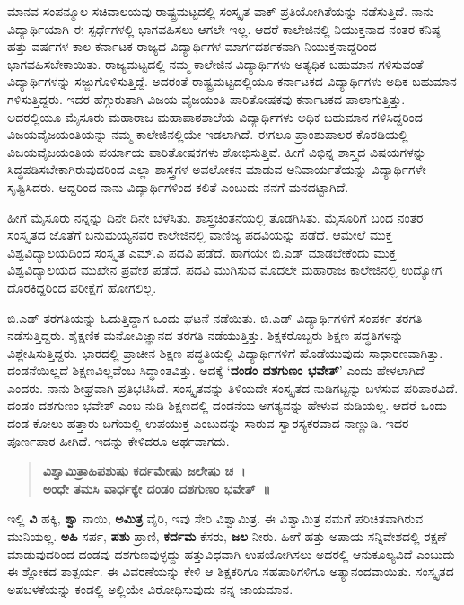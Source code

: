 {ಮಾನವ ಸಂಪನ್ಮೂಲ ಸಚಿವಾಲಯವು ರಾಷ್ಟ್ರಮಟ್ಟದಲ್ಲಿ ಸಂಸ್ಕೃತ ವಾಕ್ ಪ್ರತಿ\-ಯೋಗಿತೆಯನ್ನು ನಡೆಸುತ್ತಿದೆ.  ನಾನು ವಿದ್ಯಾರ್ಥಿಯಾಗಿ ಈ ಸ್ಪರ್ಧೆಗಳಲ್ಲಿ ಭಾಗ\-ವಹಿಸಲು ಆಗಲೇ ಇಲ್ಲ.  ಆದರೆ ಕಾಲೇಜಿನಲ್ಲಿ ನಿಯುಕ್ತನಾದ ನಂತರ ಕನಿಷ್ಠ ಹತ್ತು ವರ್ಷಗಳ ಕಾಲ ಕರ್ನಾಟಕ ರಾಜ್ಯದ ವಿದ್ಯಾರ್ಥಿಗಳ ಮಾರ್ಗದರ್ಶಕನಾಗಿ ನಿಯುಕ್ತನಾದ್ದರಿಂದ ಭಾಗವ\-ಹಿಸಬೇಕಾಯಿತು.  ರಾಜ್ಯಮಟ್ಟದಲ್ಲಿ ನಮ್ಮ ಕಾಲೇಜಿನ ವಿದ್ಯಾರ್ಥಿಗಳು ಅತ್ಯಧಿಕ ಬಹುಮಾನ ಗಳಿಸುವಂತೆ ವಿದ್ಯಾರ್ಥಿಗಳನ್ನು ಸಜ್ಜುಗೊಳಿಸುತ್ತಿದ್ದೆ.  ಅದರಂತೆ ರಾಷ್ಟ್ರಮಟ್ಟದಲ್ಲಿಯೂ ಕರ್ನಾಟಕದ ವಿದ್ಯಾರ್ಥಿಗಳು ಅಧಿಕ ಬಹುಮಾನ ಗಳಿಸುತ್ತಿದ್ದರು.  ಇದರ ಹೆಗ್ಗುರುತಾಗಿ ವಿಜಯ ವೈಜಯಂತಿ ಪಾರಿತೋಷಕವು ಕರ್ನಾಟಕದ ಪಾಲಾಗುತ್ತಿತ್ತು.  ಅದರಲ್ಲಿಯೂ ಮೈಸೂರು ಮಹಾರಾಜ ಮಹಾಪಾಠಶಾಲೆಯ ವಿದ್ಯಾರ್ಥಿ\-ಗಳು ಅಧಿಕ ಬಹುಮಾನ ಗಳಿಸಿದ್ದರಿಂದ ವಿಜಯವೈಜಯಂತಿಯನ್ನು ನಮ್ಮ ಕಾಲೇಜಿನಲ್ಲಿಯೇ ಇಡಲಾಗಿದೆ.  ಈಗಲೂ ಪ್ರಾಂಶುಪಾಲರ ಕೊಠಡಿಯಲ್ಲಿ ವಿಜಯವೈಜಯಂತಿಯ ಪರ್ಯಾಯ ಪಾರಿತೋಷಕಗಳು ಶೋಭಿಸುತ್ತಿವೆ.  ಹೀಗೆ ವಿಭಿನ್ನ ಶಾಸ್ತ್ರದ ವಿಷಯಗಳನ್ನು ಸಿದ್ಧಪಡಿಸಬೇಕಾಗಿರುವುದರಿಂದ ಎಲ್ಲಾ ಶಾಸ್ತ್ರಗಳ ಅವಲೋಕನ ಮಾಡುವ ಅನಿವಾರ್ಯತೆಯನ್ನು ವಿದ್ಯಾರ್ಥಿಗಳೇ ಸೃಷ್ಟಿಸಿದರು.   ಆದ್ದರಿಂದ ನಾನು ವಿದ್ಯಾರ್ಥಿಗಳಿಂದ ಕಲಿತೆ ಎಂಬುದು ನನಗೆ ಮನದಟ್ಟಾಗಿದೆ.  

ಹೀಗೆ ಮೈಸೂರು ನನ್ನನ್ನು ದಿನೇ ದಿನೇ ಬೆಳೆಸಿತು.  ಶಾಸ್ತ್ರಚಿಂತನೆಯಲ್ಲಿ ತೊಡಗಿಸಿತು.  ಮೈಸೂರಿಗೆ ಬಂದ ನಂತರ ಸಂಸ್ಕೃತದ ಜೊತೆಗೆ ಬನುಮಯ್ಯನವರ ಕಾಲೇಜಿನಲ್ಲಿ ವಾಣಿಜ್ಯ ಪದವಿಯನ್ನು ಪಡೆದೆ. ಆಮೇಲೆ ಮುಕ್ತ ವಿಶ್ವವಿದ್ಯಾಲಯದಿಂದ ಸಂಸ್ಕೃತ ಎಮ್.ಎ ಪದವಿ ಪಡೆದೆ. ಹಾಗೆಯೇ ಬಿ.ಎಡ್ ಮಾಡಬೇಕೆಂದು ಮುಕ್ತ ವಿಶ್ವವಿದ್ಯಾ\-ಲಯದ ಮುಖೇನ ಪ್ರವೇಶ ಪಡೆದೆ. ಪದವಿ ಮುಗಿಸುವ ಮೊದಲೇ ಮಹಾರಾಜ ಕಾಲೇಜಿ\-ನಲ್ಲಿ ಉದ್ಯೋಗ ದೊರಕಿದ್ದರಿಂದ ಪರೀಕ್ಷೆಗೆ ಹೋಗಲಿಲ್ಲ.  

ಬಿ.ಎಡ್ ತರಗತಿಯನ್ನು ಓದುತ್ತಿದ್ದಾಗ ಒಂದು ಘಟನೆ ನಡೆಯಿತು.  ಬಿ.ಎಡ್ ವಿದ್ಯಾರ್ಥಿಗಳಿಗೆ ಸಂಪರ್ಕ ತರಗತಿ ನಡೆಸುತ್ತಿದ್ದರು. ಶೈಕ್ಷಣಿಕ ಮನೋವಿಜ್ಞಾನದ ತರಗತಿ ನಡೆಯುತ್ತಿತ್ತು.  ಶಿಕ್ಷಕರೊಬ್ಬರು ಶಿಕ್ಷಣ ಪದ್ಧತಿಗಳನ್ನು ವಿಶ್ಲೇಷಿಸುತ್ತಿದ್ದರು.  ಭಾರದಲ್ಲಿ ಪ್ರಾಚೀನ ಶಿಕ್ಷಣ ಪದ್ಧತಿಯಲ್ಲಿ ವಿದ್ಯಾರ್ಥಿಗಳಿಗೆ ಹೊಡೆಯುವುದು ಸಾಧಾರಣವಾಗಿತ್ತು. ದಂಡನೆಯಿಲ್ಲದೆ ಶಿಕ್ಷಣವಿಲ್ಲವೆಂಬ ಸಿದ್ಧಾಂತವಿತ್ತು.  ಅದಕ್ಕೆ ‘\textbf{ದಂಡಂ ದಶಗುಣಂ ಭವೇತ್}’ ಎಂದು ಹೇಳಲಾಗಿದೆ ಎಂದರು.  ನಾನು ಶೀಘ್ರವಾಗಿ ಪ್ರತಿಭಟಿಸಿದೆ.  ಸಂಸ್ಕೃತ\-ವನ್ನು ತಿಳಿಯದೇ ಸಂಸ್ಕೃತದ ನುಡಿಗಟ್ಟನ್ನು ಬಳಸುವ ಪರಿಪಾಠವಿದೆ.  ದಂಡಂ ದಶಗುಣಂ ಭವೇತ್ ಎಂಬ ನುಡಿ ಶಿಕ್ಷಣದಲ್ಲಿ ದಂಡನೆಯ ಅಗತ್ಯವನ್ನು ಹೇಳುವ ನುಡಿಯಲ್ಲ.  ಆದರೆ ಒಂದು ದಂಡ  \enginline{-}  ಕೋಲು ಹತ್ತಾರು ಬಗೆಯಲ್ಲಿ ಉಪಯುಕ್ತ ಎಂಬುದನ್ನು ಸಾರುವ ಸ್ವಾರಸ್ಯಕರವಾದ ನಾಣ್ಣುಡಿ.  ಇದರ ಪೂರ್ಣಪಾಠ ಹೀಗಿದೆ.  ಇದನ್ನು ಕೇಳಿದರೂ ಅರ್ಥವಾಗದು. 
\begin{verse}
{\kannadafont\bfseries ವಿಶ್ವಾಮಿತ್ರಾಹಿಪಶುಷು ಕರ್ದಮೇಷು ಜಲೇಷು ಚ~।\\
ಅಂಧೇ ತಮಸಿ ವಾರ್ಧಕ್ಯೇ ದಂಡಂ ದಶಗುಣಂ ಭವೇತ್~॥}
\end{verse}
ಇಲ್ಲಿ \textbf{ವಿ}  \enginline{-}  ಹಕ್ಕಿ, \textbf{ಶ್ವಾ}  \enginline{-}  ನಾಯಿ, \textbf{ಅಮಿತ್ರ}  \enginline{-}  ವೈರಿ, ಇವು ಸೇರಿ ವಿಶ್ವಾಮಿತ್ರ.  ಈ ವಿಶ್ವಾಮಿತ್ರ ನಮಗೆ ಪರಿಚಿತವಾಗಿರುವ ಮುನಿಯಲ್ಲ.  \textbf{ಅಹಿ}   \enginline{-}   ಸರ್ಪ, \textbf{ಪಶು}   \enginline{-}   ಪ್ರಾಣಿ, \textbf{ಕರ್ದಮ}   \enginline{-}   ಕೆಸರು, \textbf{ಜಲ}   \enginline{-}   ನೀರು.  ಹೀಗೆ ಹತ್ತು ಅಪಾಯ ಸನ್ನಿವೇಶದಲ್ಲಿ ರಕ್ಷಣೆ ಮಾಡುವುದರಿಂದ ದಂಡವು ದಶಗುಣವುಳ್ಳದ್ದು   \enginline{-}   ಹತ್ತುವಿಧವಾಗಿ ಉಪಯೋಗಿಸಲು ಅದರಲ್ಲಿ ಆನುಕೂಲ್ಯವಿದೆ ಎಂಬುದು ಈ ಶ್ಲೋಕದ ತಾತ್ಪರ್ಯ.   ಈ ವಿವರಣೆಯನ್ನು ಕೇಳಿ ಆ ಶಿಕ್ಷಕರಿಗೂ ಸಹಪಾಠಿಗಳಿಗೂ ಅತ್ಯಾನಂದವಾಯಿತು.  ಸಂಸ್ಕೃತದ ಅಪಬಳಕೆಯನ್ನು ಕಂಡಲ್ಲಿ ಅಲ್ಲಿಯೇ ವಿರೋಧಿಸುವುದು ನನ್ನ ಜಾಯಮಾನ.  

}
